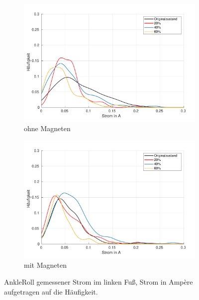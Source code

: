 \begin{figure}[tb]
	\centering
	\begin{subfigure}[c]{.9\linewidth}
		\centering
		\includegraphics[width=\linewidth]{Bilder/links_Current_AnkleRoll_ohneM.pdf}
		\caption{ohne Magneten}
	\end{subfigure}
	\begin{subfigure}[c]{.9\linewidth}
		\centering
		\includegraphics[width=\linewidth]{Bilder/links_Current_AnkleRoll_mitM.pdf}
		\caption{mit Magneten}
	\end{subfigure}
	\caption{AnkleRoll gemessener Strom im linken Fuß, Strom in Ampère aufgetragen auf die Häufigkeit.} \label{AnkleRoll_Current_links}
\end{figure}
